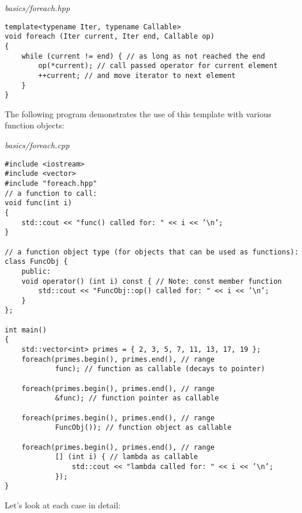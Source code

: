 \noindent
\textit{basics/foreach.hpp}
\begin{lstlisting}[style=styleCXX]
template<typename Iter, typename Callable>
void foreach (Iter current, Iter end, Callable op)
{
	while (current != end) { // as long as not reached the end
		op(*current); // call passed operator for current element
		++current; // and move iterator to next element
	}
}
\end{lstlisting}

The following program demonstrates the use of this template with various function objects:

\noindent
\textit{basics/foreach.cpp}
\begin{lstlisting}[style=styleCXX]
#include <iostream>
#include <vector>
#include "foreach.hpp"
// a function to call:
void func(int i)
{
	std::cout << "func() called for: " << i << ’\n’;
}

// a function object type (for objects that can be used as functions):
class FuncObj {
	public:
	void operator() (int i) const { // Note: const member function
		std::cout << "FuncObj::op() called for: " << i << ’\n’;
	}
};

int main()
{
	std::vector<int> primes = { 2, 3, 5, 7, 11, 13, 17, 19 };
	foreach(primes.begin(), primes.end(), // range
			func); // function as callable (decays to pointer)
	
	foreach(primes.begin(), primes.end(), // range
			&func); // function pointer as callable
			
	foreach(primes.begin(), primes.end(), // range
			FuncObj()); // function object as callable
	
	foreach(primes.begin(), primes.end(), // range
			[] (int i) { // lambda as callable
				std::cout << "lambda called for: " << i << ’\n’;
			});
}
\end{lstlisting}

Let’s look at each case in detail:

